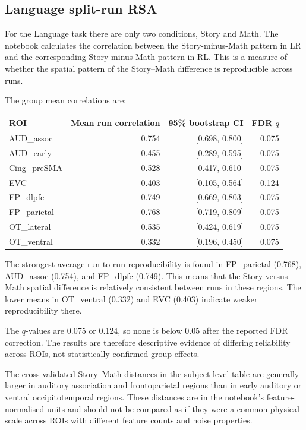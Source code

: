 \documentclass[11pt,a4paper]{article}
\begin{document}
\subsection{Language split-run RSA}

For the Language task there are only two conditions, Story and Math. The notebook calculates the correlation between the Story-minus-Math pattern in LR and the corresponding Story-minus-Math pattern in RL. This is a measure of whether the spatial pattern of the Story--Math difference is reproducible across runs.

The group mean correlations are:

\begin{center}
\begin{tabular}{lrrr}
\toprule
\textbf{ROI} & \textbf{Mean run correlation} & \textbf{95\% bootstrap CI} & \textbf{FDR \(q\)}\\
\midrule
AUD\_assoc & 0.754 & [0.698, 0.800] & 0.075\\
AUD\_early & 0.455 & [0.289, 0.595] & 0.075\\
Cing\_preSMA & 0.528 & [0.417, 0.610] & 0.075\\
EVC & 0.403 & [0.105, 0.564] & 0.124\\
FP\_dlpfc & 0.749 & [0.669, 0.803] & 0.075\\
FP\_parietal & 0.768 & [0.719, 0.809] & 0.075\\
OT\_lateral & 0.535 & [0.424, 0.619] & 0.075\\
OT\_ventral & 0.332 & [0.196, 0.450] & 0.075\\
\bottomrule
\end{tabular}
\end{center}

The strongest average run-to-run reproducibility is found in FP\_parietal (0.768), AUD\_assoc (0.754), and FP\_dlpfc (0.749). This means that the Story-versus-Math spatial difference is relatively consistent between runs in these regions. The lower means in OT\_ventral (0.332) and EVC (0.403) indicate weaker reproducibility there.

The \(q\)-values are 0.075 or 0.124, so none is below 0.05 after the reported FDR correction. The results are therefore descriptive evidence of differing reliability across ROIs, not statistically confirmed group effects.

The cross-validated Story--Math distances in the subject-level table are generally larger in auditory association and frontoparietal regions than in early auditory or ventral occipitotemporal regions. These distances are in the notebook's feature-normalised units and should not be compared as if they were a common physical scale across ROIs with different feature counts and noise properties.
\end{document}
